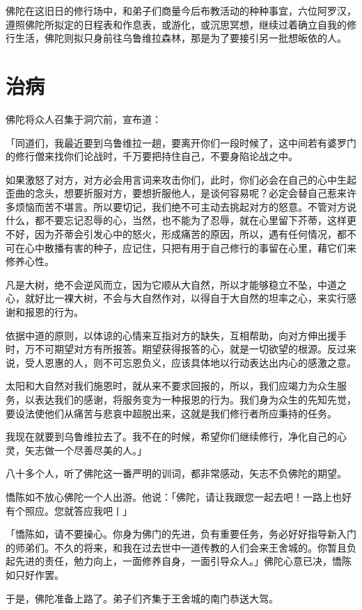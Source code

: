 \documentclass[12pt,twoside,openany]{book}
\begin{document}
佛陀在这旧日的修行场中，和弟子们商量今后布教活动的种种事宜，六位阿罗汉，遵照佛陀所拟定的日程表和作息表，或游化，或沉思冥想，继续过着确立自我的修行生活，佛陀则拟只身前往乌鲁维拉森林，那是为了要接引另一批想皈依的人。

\section{治病}\label{sec3.3}

佛陀将众人召集于洞穴前，宣布道：

「同道们，我最近要到乌鲁维拉一趟，要离开你们一段时候了，这中间若有婆罗门的修行僧来找你们论战时，千万要把持住自己，不要身陷论战之中。

如果激怒了对方，对方必会用言词来攻击你们，此时，你们必会在自己的心中生起歪曲的念头，想要折服对方，要想折服他人，是谈何容易呢？必定会替自己惹来许多烦恼而苦不堪言。所以要切记，我们绝不可主动去挑起对方的怒意。不管对方说什么，都不要忘记忍辱的心，当然，也不能为了忍辱，就在心里留下芥蒂，这样更不好，因为芥蒂会引发心中的怒火，形成痛苦的原因，所以，遇有任何情况，都不可在心中散播有害的种子，应记住，只把有用于自己修行的事留在心里，藉它们来修养心性。

凡是大树，绝不会逆风而立，因为它顺从大自然，所以才能够稳立不坠，中道之心，就好比一裸大树，不会与大自然作对，以得自于大自然的坦率之心，来实行感谢和报恩的行为。

依据中道的原则，以体谅的心情来互指对方的缺失，互相帮助，向对方伸出援手时，万不可期望对方有所报答。期望获得报答的心，就是一切欲望的根源。反过来说，受人恩惠的人，则不可忘恩负义，应该具体地以行动表达出内心的感激之意。

太阳和大自然对我们施恩时，就从来不要求回报的，所以，我们应竭力为众生服务，以表达我们的感谢，将服务变为一种报恩的行为。我们身为众生的先知先觉，要设法使他们从痛苦与悲哀中超脱出来，这就是我们修行者所应秉持的任务。

我现在就要到乌鲁维拉去了。我不在的时候，希望你们继续修行，净化自己的心灵，矢志做一个尽善尽美的人。」

八十多个人，听了佛陀这一番严明的训词，都非常感动，矢志不负佛陀的期望。

憍陈如不放心佛陀一个人出游。他说：「佛陀，请让我跟您一起去吧！一路上也好有个照应。您就答应我吧丨」

「憍陈如，请不要操心。你身为佛门的先进，负有重要任务，务必好好指导新入门的师弟们。不久的将来，和我在过去世中一道传教的人们会来王舍城的。你暂且负起先进的责任，勉力向上，一面修养自身，一面引导众人。」佛陀心意已决，憍陈如只好作罢。

于是，佛陀准备上路了。弟子们齐集于王舍城的南门恭送大驾。
\end{document}

